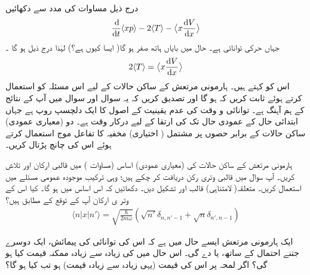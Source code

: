 \quad
 درج ذیل مساوات  کی مدد سے دکھائیں 
\begin{align}
\frac{\dif}{\dif t} \langle xp \rangle -2\langle T \rangle - \big\langle x \frac{\dif V}{\dif x} \big\rangle
\end{align}
جہاں  حرکی توانائی  ہے۔ حال میں بایاں ہاتھ صفر ہو گا( ایسا کیوں ہے؟) لہٰذا درج ذیل ہو گا ۔
\begin{align}
2\langle T \rangle = \big\langle x \frac{\dif V}{\dif x} \big\rangle
\end{align}
اس کو  کہتے ہیں۔ ہارمونی مرتعش کے ساکن حالات کے لیے اس مسئلہ کو استعمال کرتے ہوئے ثابت کریں کہ  ہو گا اور تصدیق کریں کہ یہ سوال اور سوال  میں آپ کے نتائج کے ہم آہنگ ہے۔
توانائی و وقت کی عدم یقینیت کے اصول کا ایک دلچسپ روپ  ہے جہاں ابتدائی حال  کے عمودی حال تک  کی ارتقا کے لیے درکار وقت  ہے۔ دو (معیاری عمودی) ساکن حالات کے برابر حصوں پر مشتمل ( اختیاری) مخفیہ کا تفاعل موج  استعمال کرتے ہوئے اس کی چانچ پڑتال کریں۔

ہارمونی مرتعش کے ساکن حالات کی (معیاری عمودی) اساس (مساوات ) میں قالبی ارکان  اور  تلاش کریں۔ آپ سوال  میں قالبی وتری رکن  دریافت کر چکے ہیں؛ وہی ترکیب موجودہ عمومی مسئلے میں استعمال کریں۔ متعلقہ( لامتناہی) قالب  اور  تشکیل دیں۔ دکھائیں کہ اس اساس میں
 ہو گا۔ کیا اس کے وتر ی ارکان آپ کے توقع کے مطابق ہیں؟
\begin{align}
\langle n|x|n'\rangle=\sqrt{\frac{\hslash}{2m\omega}}(\sqrt{n'}\delta_{n,n'-1}+\sqrt{n}\delta_{n',n-1})
\end{align}

ایک ہارمونی مرتعش ایسے حال میں ہے کہ اس کی توانائی کی پیمائش، ایک دوسرے جتنے احتمال کے ساتھ،  یا  دے گی۔ اس حال میں  کی زیادہ سے زیادہ ممکنہ قیمت کیا ہو گی؟ اگر لمحہ  پر اس کی قیمت (یہی زیادہ سے زیادہ قیمت) ہو تب  کیا ہو گا؟

